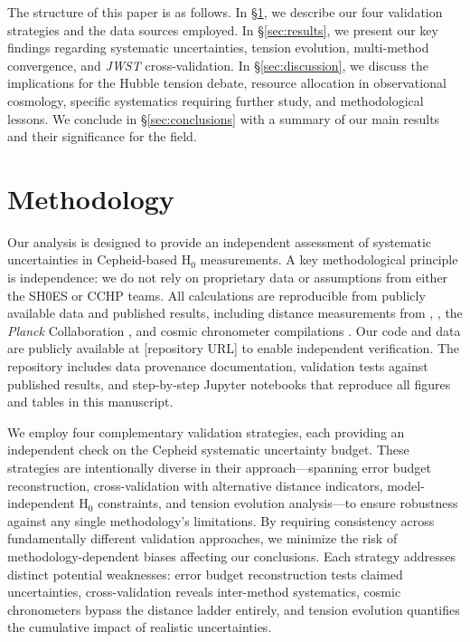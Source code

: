 \documentclass[twocolumn, linenumbers]{aastex701}
\begin{document}
The structure of this paper is as follows. In \S\ref{sec:methods}, we describe our four validation strategies and the data sources employed. In \S\ref{sec:results}, we present our key findings regarding systematic uncertainties, tension evolution, multi-method convergence, and \textit{JWST} cross-validation. In \S\ref{sec:discussion}, we discuss the implications for the Hubble tension debate, resource allocation in observational cosmology, specific systematics requiring further study, and methodological lessons. We conclude in \S\ref{sec:conclusions} with a summary of our main results and their significance for the field.


\section{Methodology} \label{sec:methods}

Our analysis is designed to provide an independent assessment of systematic uncertainties in Cepheid-based H$_0$ measurements. A key methodological principle is independence: we do not rely on proprietary data or assumptions from either the SH0ES or CCHP teams. All calculations are reproducible from publicly available data and published results, including distance measurements from \citet{Riess2022}, \citet{Freedman2024}, the \textit{Planck} Collaboration \citep{Planck2018}, and cosmic chronometer compilations \citep{Moresco2022}. Our code and data are publicly available at [repository URL] to enable independent verification. The repository includes data provenance documentation, validation tests against published results, and step-by-step Jupyter notebooks that reproduce all figures and tables in this manuscript.

We employ four complementary validation strategies, each providing an independent check on the Cepheid systematic uncertainty budget. These strategies are intentionally diverse in their approach---spanning error budget reconstruction, cross-validation with alternative distance indicators, model-independent H$_0$ constraints, and tension evolution analysis---to ensure robustness against any single methodology's limitations. By requiring consistency across fundamentally different validation approaches, we minimize the risk of methodology-dependent biases affecting our conclusions. Each strategy addresses distinct potential weaknesses: error budget reconstruction tests claimed uncertainties, cross-validation reveals inter-method systematics, cosmic chronometers bypass the distance ladder entirely, and tension evolution quantifies the cumulative impact of realistic uncertainties.
\end{document}
